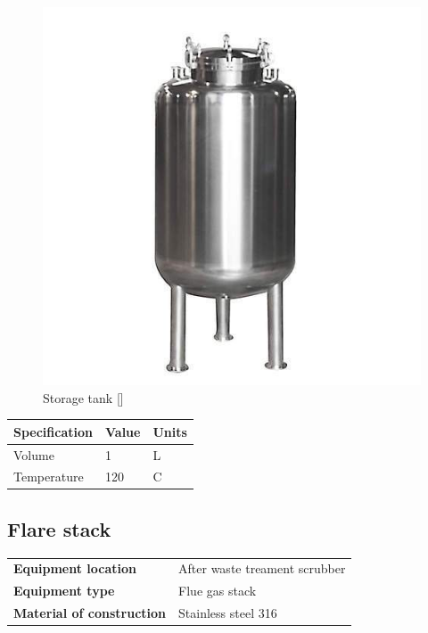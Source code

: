 \begin{figure}[H]
    \centering
    \includegraphics[width=\linewidth]{chapters/Z-support/figures/stainless-steel-storage-tank-500x500.jpg}
    \caption{Storage tank []}
\end{figure}

\begin{table}[H]
\centering
\begin{tabular}{@{}l|l|l@{}}
\toprule
\textbf{Specification}                    & \textbf{Value} & \textbf{Units} \\ \midrule
Volume                              & 1            & L            \\ \midrule
Temperature                     & 120     & C           \\ \bottomrule
\end{tabular}
\end{table}




\newpage
\subsection{Flare stack}

\begin{table}[H]
    \centering
    \begin{tabular}{@{}l|l@{}}
    \toprule
      \textbf{Equipment location}  & After waste treament scrubber\\
       \textbf{Equipment type}  & Flue gas stack \\
       \textbf{Material of construction} & Stainless steel 316 \\
       \bottomrule
    \end{tabular}
\end{table}


